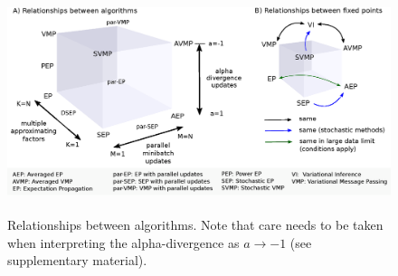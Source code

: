 \begin{figure}
\centering
\def\svgwidth{1\linewidth}
\includegraphics[height=6.5cm]{fig/relationship-algorithms.eps}%
\caption{Relationships between algorithms. Note that care needs to be taken when interpreting the alpha-divergence as $a \rightarrow -1$ (see supplementary material).}
\label{fig:relationship-algorithms}
\end{figure}